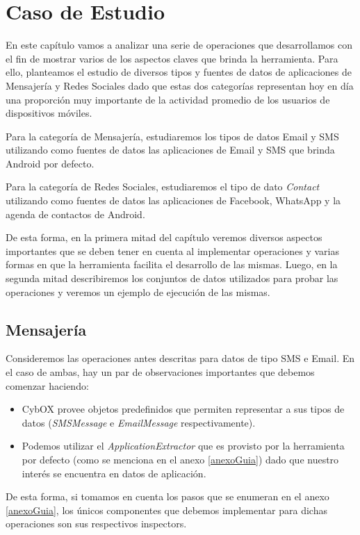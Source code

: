 \chapter{Caso de Estudio}
En este capítulo vamos a analizar una serie de operaciones que desarrollamos con el fin de mostrar varios de los aspectos claves que brinda la herramienta. Para ello, planteamos el estudio de diversos tipos y fuentes de datos de aplicaciones de Mensajería y Redes Sociales dado que estas dos categorías representan hoy en día una proporción muy importante de la actividad promedio de los usuarios de dispositivos móviles.

Para la categoría de Mensajería, estudiaremos los tipos de datos Email y SMS utilizando como fuentes de datos las aplicaciones de Email y SMS que brinda Android por defecto.

Para la categoría de Redes Sociales, estudiaremos el tipo de dato \emph{Contact} utilizando como fuentes de datos las aplicaciones de Facebook, WhatsApp y la agenda de contactos de Android.

De esta forma, en la primera mitad del capítulo veremos diversos aspectos importantes que se deben tener en cuenta al implementar operaciones y varias formas en que la herramienta facilita el desarrollo de las mismas. Luego, en la segunda mitad describiremos los conjuntos de datos utilizados para probar las operaciones y veremos un ejemplo de ejecución de las mismas.

\section{Mensajería}
Consideremos las operaciones antes descritas para datos de tipo SMS e Email. En el caso de ambas, hay un par de observaciones importantes que debemos comenzar haciendo:
\begin{itemize}
\item CybOX provee objetos predefinidos que permiten representar a sus tipos de datos (\emph{SMSMessage} e \emph{EmailMessage} respectivamente).
\item Podemos utilizar el \emph{ApplicationExtractor} que es provisto por la herramienta por defecto (como se menciona en el anexo \ref{anexoGuia}) dado que nuestro interés se encuentra en datos de aplicación.
\end{itemize}

De esta forma, si tomamos en cuenta los pasos que se enumeran en el anexo \ref{anexoGuia}, los únicos componentes que debemos implementar para dichas operaciones son sus respectivos inspectors.

